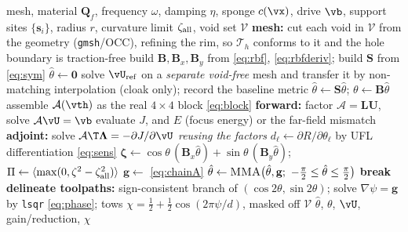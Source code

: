 \documentclass[11pt]{article}
\begin{document}
\begin{algorithm}[H]
\caption{Orientation design for wave control (\texttt{dolfinx}, Chain A)}
\label{alg:wave}
\begin{algorithmic}[1]
\Require mesh, material $\mathbf Q_f$, frequency $\omega$, damping $\eta$, sponge
  $c(\vx)$, drive $\vb$, support sites $\{\mathbf s_i\}$, radius $r$, curvature
  limit $\zeta_{\rm all}$, void set $\mathcal V$
\State \textbf{mesh:} cut each void in $\mathcal V$ from the geometry
  (\texttt{gmsh}/OCC), refining the rim, so $\mathcal T_h$ conforms to it and the
  hole boundary is traction-free 
\State build $\mathbf B,\mathbf B_x,\mathbf B_y$ from \eqref{eq:rbf},
  \eqref{eq:rbfderiv}; build $\mathbf S$ from \eqref{eq:sym}
\State $\hat\theta\gets\mathbf 0$ 
\State solve $\vU_{\rm ref}$ on a \emph{separate void-free} mesh and transfer it by
  non-matching interpolation (cloak only); record the baseline metric
 
    \State $\hat\theta\gets\mathbf S\hat\theta$;\quad
           $\theta\gets\mathbf B\hat\theta$
    \State assemble $\mathcal A(\vth)$ as the real $4\times4$ block
           \eqref{eq:block} 
    \State \textbf{forward:} factor $\mathcal A=\mathbf{LU}$, solve
           $\mathcal A\vU=\vb$
    \State evaluate $J$, and $E$ (focus energy) or the far-field mismatch
    \State \textbf{adjoint:} solve $\mathcal A\T\bm\Lambda=-\partial J/\partial\vU$
           \emph{reusing the factors}
    \State $d_\ell\gets\partial R/\partial\theta_\ell$ by UFL differentiation
           \eqref{eq:sens}
    \State $\bm\zeta\gets\cos\theta\,(\mathbf B_x\hat\theta)
           +\sin\theta\,(\mathbf B_y\hat\theta)$;\quad
           $\Pi\gets\langle\max(0,\zeta^2-\zeta_{\rm all}^2)\rangle$
    \State $\mathbf g\gets$ \eqref{eq:chainA}
    \State $\hat\theta\gets\textsc{MMA}\bigl(\hat\theta,\mathbf g;\
           -\tfrac\pi2\le\hat\theta\le\tfrac\pi2\bigr)$
  \EndFor
   \textbf{break} 
  \EndIf
\EndFor
\State \textbf{delineate toolpaths:} sign-consistent branch of
  $(\cos2\theta,\sin2\theta)$; solve $\nabla\psi=\mathbf g$ by \texttt{lsqr}
  \eqref{eq:phase}; tows $\chi=\tfrac12+\tfrac12\cos(2\pi\psi/d)$, masked off
  $\mathcal V$
\State \Return $\hat\theta$, $\theta$, $\vU$, gain/reduction, $\chi$
\end{algorithmic}
\end{algorithm}
\end{document}

